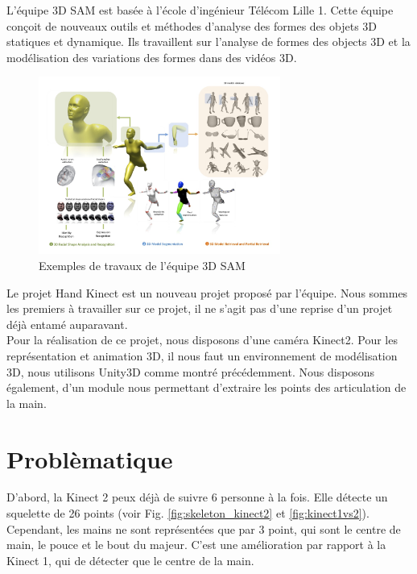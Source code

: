 L'équipe 3D SAM est basée à l'école d'ingénieur Télécom Lille 1. 
Cette équipe conçoit de nouveaux outils et méthodes d'analyse des 
formes des objets 3D statiques et dynamique. Ils travaillent sur 
l'analyse de formes des objects 3D et la modélisation des variations 
des formes dans des vidéos 3D.

\begin{figure}[H]
  \begin{center}
    \includegraphics[width=300px]{images/accueil-illus.jpg}
    \caption{Exemples de travaux de l'équipe 3D SAM}
  \end{center}
\end{figure}

Le projet \og Hand Kinect \fg est un nouveau projet proposé par 
l'équipe. Nous sommes les premiers à travailler sur ce projet, il 
ne s'agit pas d'une reprise d'un projet déjà entamé auparavant.\\

Pour la réalisation de ce projet, nous disposons d'une caméra Kinect2. 
Pour les représentation et animation 3D, il nous faut un environnement 
de modélisation 3D, nous utilisons Unity3D comme montré précédemment. 
Nous disposons également, d'un module nous permettant d'extraire les 
points des articulation de la main.

\section{Problèmatique}
D'abord, la Kinect 2 peux déjà de suivre 6 personne à la fois. Elle 
détecte un squelette de 26 points (voir Fig. 
\ref{fig:skeleton_kinect2} et \ref{fig:kinect1vs2}). Cependant, les 
mains ne sont représentées que par 3 point, qui sont le centre de 
main, le pouce et le bout du majeur. C'est une amélioration par 
rapport à la Kinect 1, qui de détecter que le centre de la main.\\

